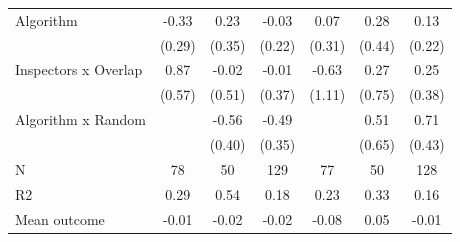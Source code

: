 \begin{tabular}{lccc|ccc}
Algorithm   &       -0.33         &        0.23         &       -0.03         &        0.07         &        0.28         &        0.13         \\
            &      (0.29)         &      (0.35)         &      (0.22)         &      (0.31)         &      (0.44)         &      (0.22)         \\
\addlinespace
Inspectors x Overlap&        0.87         &       -0.02         &       -0.01         &       -0.63         &        0.27         &        0.25         \\
            &      (0.57)         &      (0.51)         &      (0.37)         &      (1.11)         &      (0.75)         &      (0.38)         \\
\addlinespace
Algorithm x Random&                     &       -0.56         &       -0.49         &                     &        0.51         &        0.71         \\
            &                     &      (0.40)         &      (0.35)         &                     &      (0.65)         &      (0.43)         \\
\midrule
N           &          78         &          50         &         129         &          77         &          50         &         128         \\
R2          &        0.29         &        0.54         &        0.18         &        0.23         &        0.33         &        0.16         \\
Mean outcome&       -0.01         &       -0.02         &       -0.02         &       -0.08         &        0.05         &       -0.01         \\
\bottomrule \end{tabular}
